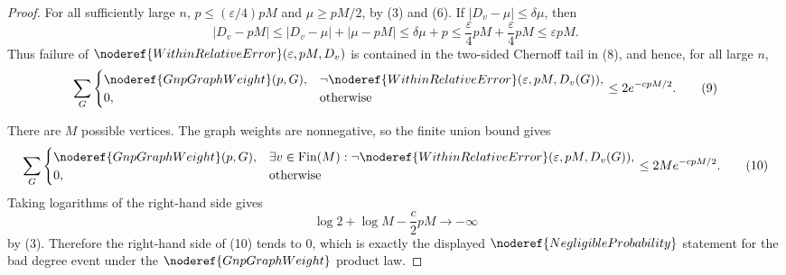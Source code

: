 \begin{proof}
For all sufficiently large \(n\), \(p\le(\varepsilon/4)pM\) and
\(\mu\ge pM/2\), by (3) and (6).  If
\(|D_v-\mu|\le\delta\mu\), then
\[
|D_v-pM|
\le |D_v-\mu|+|\mu-pM|
\le \delta\mu+p
\le \frac{\varepsilon}{4}pM+\frac{\varepsilon}{4}pM
\le \varepsilon pM.
\]
Thus failure of
\(\noderef{WithinRelativeError}(\varepsilon,pM,D_v)\) is contained in the
two-sided Chernoff tail in (8), and hence, for all large \(n\),
\[
\sum_G
\begin{cases}
\noderef{GnpGraphWeight}(p,G),
&\neg\noderef{WithinRelativeError}(\varepsilon,pM,D_v(G)),\\
0,&\text{otherwise}
\end{cases}
\le 2e^{-c pM/2}.
\tag{9}
\]

There are \(M\) possible vertices.  The graph weights are nonnegative, so
the finite union bound gives
\[
\sum_G
\begin{cases}
\noderef{GnpGraphWeight}(p,G),
&\exists v\in\operatorname{Fin}(M):
  \neg\noderef{WithinRelativeError}(\varepsilon,pM,D_v(G)),\\
0,&\text{otherwise}
\end{cases}
\le 2M e^{-c pM/2}.
\tag{10}
\]
Taking logarithms of the right-hand side gives
\[
\log 2+\log M-\frac c2 pM\to-\infty
\]
by (3).  Therefore the right-hand side of (10) tends to \(0\), which is
exactly the displayed \(\noderef{NegligibleProbability}\) statement for the
bad degree event under the \(\noderef{GnpGraphWeight}\) product law.
\end{proof}

